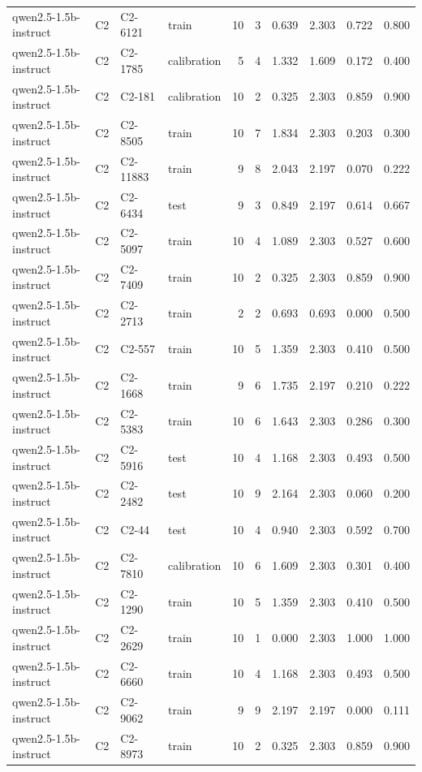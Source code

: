 \begin{table}
\begin{tabular}{llllrrrrrr}
qwen2.5-1.5b-instruct & C2 & C2-6121 & train & 10 & 3 & 0.639 & 2.303 & 0.722 & 0.800 \\
qwen2.5-1.5b-instruct & C2 & C2-1785 & calibration & 5 & 4 & 1.332 & 1.609 & 0.172 & 0.400 \\
qwen2.5-1.5b-instruct & C2 & C2-181 & calibration & 10 & 2 & 0.325 & 2.303 & 0.859 & 0.900 \\
qwen2.5-1.5b-instruct & C2 & C2-8505 & train & 10 & 7 & 1.834 & 2.303 & 0.203 & 0.300 \\
qwen2.5-1.5b-instruct & C2 & C2-11883 & train & 9 & 8 & 2.043 & 2.197 & 0.070 & 0.222 \\
qwen2.5-1.5b-instruct & C2 & C2-6434 & test & 9 & 3 & 0.849 & 2.197 & 0.614 & 0.667 \\
qwen2.5-1.5b-instruct & C2 & C2-5097 & train & 10 & 4 & 1.089 & 2.303 & 0.527 & 0.600 \\
qwen2.5-1.5b-instruct & C2 & C2-7409 & train & 10 & 2 & 0.325 & 2.303 & 0.859 & 0.900 \\
qwen2.5-1.5b-instruct & C2 & C2-2713 & train & 2 & 2 & 0.693 & 0.693 & 0.000 & 0.500 \\
qwen2.5-1.5b-instruct & C2 & C2-557 & train & 10 & 5 & 1.359 & 2.303 & 0.410 & 0.500 \\
qwen2.5-1.5b-instruct & C2 & C2-1668 & train & 9 & 6 & 1.735 & 2.197 & 0.210 & 0.222 \\
qwen2.5-1.5b-instruct & C2 & C2-5383 & train & 10 & 6 & 1.643 & 2.303 & 0.286 & 0.300 \\
qwen2.5-1.5b-instruct & C2 & C2-5916 & test & 10 & 4 & 1.168 & 2.303 & 0.493 & 0.500 \\
qwen2.5-1.5b-instruct & C2 & C2-2482 & test & 10 & 9 & 2.164 & 2.303 & 0.060 & 0.200 \\
qwen2.5-1.5b-instruct & C2 & C2-44 & test & 10 & 4 & 0.940 & 2.303 & 0.592 & 0.700 \\
qwen2.5-1.5b-instruct & C2 & C2-7810 & calibration & 10 & 6 & 1.609 & 2.303 & 0.301 & 0.400 \\
qwen2.5-1.5b-instruct & C2 & C2-1290 & train & 10 & 5 & 1.359 & 2.303 & 0.410 & 0.500 \\
qwen2.5-1.5b-instruct & C2 & C2-2629 & train & 10 & 1 & 0.000 & 2.303 & 1.000 & 1.000 \\
qwen2.5-1.5b-instruct & C2 & C2-6660 & train & 10 & 4 & 1.168 & 2.303 & 0.493 & 0.500 \\
qwen2.5-1.5b-instruct & C2 & C2-9062 & train & 9 & 9 & 2.197 & 2.197 & 0.000 & 0.111 \\
qwen2.5-1.5b-instruct & C2 & C2-8973 & train & 10 & 2 & 0.325 & 2.303 & 0.859 & 0.900 \\

\end{tabular}
\end{table}

